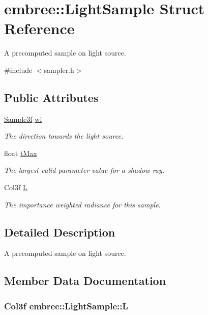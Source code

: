 \hypertarget{structembree_1_1_light_sample}{
\section{embree::LightSample Struct Reference}
\label{structembree_1_1_light_sample}
}


A precomputed sample on light source.  




{\ttfamily \#include $<$sampler.h$>$}

\subsection*{Public Attributes}
\begin{DoxyCompactItemize}
\item 
\hyperlink{structembree_1_1_sample}{Sample3f} \hyperlink{structembree_1_1_light_sample_aff124dbc25b0f7d6a08ab1c0f7e877f4}{wi}
\begin{DoxyCompactList}\small\item\em The direction towards the light source. \item\end{DoxyCompactList}\item 
float \hyperlink{structembree_1_1_light_sample_a7a579c998114bdd44ae60e24739d4734}{tMax}
\begin{DoxyCompactList}\small\item\em The largest valid parameter value for a shadow ray. \item\end{DoxyCompactList}\item 
Col3f \hyperlink{structembree_1_1_light_sample_a21807d7d8a6f3b253ce11cfb5b21992c}{L}
\begin{DoxyCompactList}\small\item\em The importance weighted radiance for this sample. \item\end{DoxyCompactList}\end{DoxyCompactItemize}


\subsection{Detailed Description}
A precomputed sample on light source. 

\subsection{Member Data Documentation}
\hypertarget{structembree_1_1_light_sample_a21807d7d8a6f3b253ce11cfb5b21992c}{
\subsubsection[{L}]{\setlength{\rightskip}{0pt plus 5cm}Col3f {\bf embree::LightSample::L}}}
\label{structembree_1_1_light_sample_a21807d7d8a6f3b253ce11cfb5b21992c}


